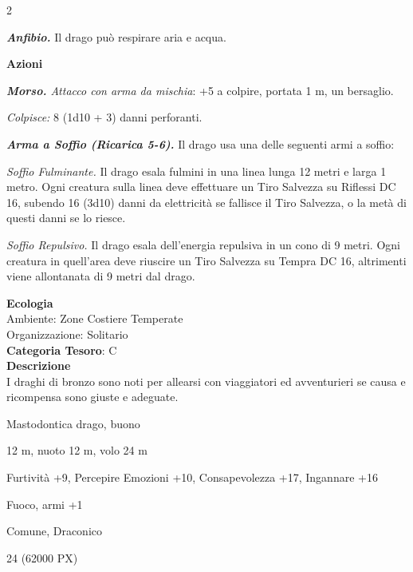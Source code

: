 \begin{multicols}{2}
{\emph{\textbf{Anfibio.}} Il drago può respirare aria e acqua.

\textbf{Azioni}

\emph{\textbf{Morso.} Attacco con arma da mischia}: +5 a colpire,
portata 1 m, un bersaglio.

\emph{Colpisce:} 8 (1d10 + 3) danni perforanti.

\emph{\textbf{Arma a Soffio (Ricarica 5-6).}} Il drago usa una delle seguenti armi a soffio:

\emph{Soffio Fulminante.} Il drago esala fulmini in una linea lunga 12 metri e larga 1 metro. Ogni creatura sulla linea deve effettuare un Tiro Salvezza su Riflessi DC 16, subendo 16 (3d10) danni da elettricità se fallisce il Tiro Salvezza, o la metà di questi danni se lo riesce.

\emph{Soffio Repulsivo.} Il drago esala dell'energia repulsiva in un cono di 9 metri. Ogni creatura in quell'area deve riuscire un Tiro Salvezza su Tempra DC 16, altrimenti viene allontanata di 9 metri dal drago.

\textbf{Ecologia}\\
Ambiente: Zone Costiere Temperate\\
Organizzazione: Solitario\\
\textbf{Categoria Tesoro}: C\\
\textbf{Descrizione}\\
I draghi di bronzo sono noti per allearsi con viaggiatori ed avventurieri se causa e ricompensa sono giuste e adeguate.

\begin{description}[noitemsep, topsep=0pt, parsep=0pt, partopsep=0pt, itemsep=1pt, leftmargin=2.35cm,  labelwidth=2.2cm, itemindent=0cm, listparindent=0pt] %
\setlength{\baselineskip}{10pt}
\item[\textbf{Taglia/Tipo}] Mastodontica drago, buono
\item[\textbf{Caratt.}] 
\item[\textbf{Punti Ferita}] 
\item[\textbf{Movimento}] 12 m, nuoto 12 m, volo 24 m
\item[\textbf{Tiri Salvez.}] 
\item[\textbf{Comp.}] Furtività +9, Percepire Emozioni +10, Consapevolezza +17, Ingannare +16
\item[\textbf{Imm. Danni}] Fuoco, armi +1
\item[\textbf{Sensi}] 
\item[\textbf{Linguaggi}] Comune, Draconico
\item[\textbf{Sfida}] 24 (62000 PX)
\end{description}
\smallskip

}
\end{multicols}

